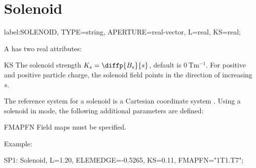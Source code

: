 \section{Solenoid}
\label{sec:solenoid}
\begin{example}
label:SOLENOID, TYPE=string, APERTURE=real-vector,
      L=real, KS=real;
\end{example}
A  has two real attributes:
\begin{kdescription}
\item[KS]
  The solenoid strength $K_s=\diffp{B_s}{s}$, default is $\SI{0}{\tesla\meter\tothe{-1}}$.
  For positive  and positive particle charge,
  the solenoid field points in the direction of increasing $s$.
\end{kdescription}
The reference system for a solenoid is a Cartesian coordinate system
. Using a solenoid in \opalt mode, the following additional parameters are defined:
\begin{kdescription}
\item[FMAPFN]
  Field maps must be specified.
\end{kdescription}
\noindent Example:
\begin{example}
SP1: Solenoid, L=1.20, ELEMEDGE=-0.5265, KS=0.11,
     FMAPFN="1T1.T7";
\end{example}

\clearpage
